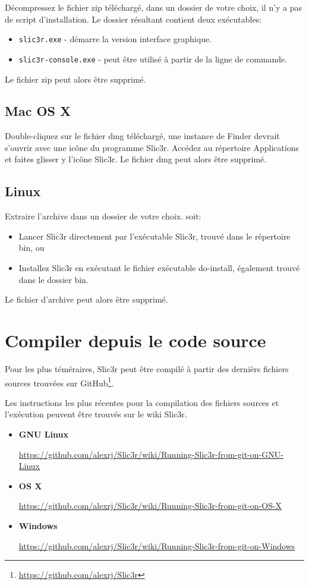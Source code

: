 D\'ecompressez le fichier zip t\'el\'echarg\'e, dans un dossier de votre choix, il n'y a pas de script d'installation. Le dossier r\'esultant contient deux ex\'ecutables:
\begin{itemize}
\item \texttt{slic3r.exe} - d\'emarre la version interface graphique.
\item \texttt{slic3r-console.exe} - peut \^etre utilis\'e \`a partir de la ligne de commande.
\end{itemize}

Le fichier zip peut alors \^etre supprim\'e.

\subsection{Mac OS X}

Double-cliquez sur le fichier dmg t\'el\'echarg\'e, une instance de Finder devrait s'ouvrir avec une ic\^one du programme Slic3r. Acc\'edez au r\'epertoire Applications et faites glisser y l'ic\^one Slic3r.
Le fichier dmg peut alors \^etre supprim\'e.

\subsection{Linux}

Extraire l'archive dans un dossier de votre choix.
soit:
\begin{itemize}
\item Lancer Slic3r directement par l'ex\'ecutable Slic3r, trouv\'e dans le r\'epertoire bin, ou
\item Installez Slic3r en ex\'ecutant le fichier ex\'ecutable do-install, \'egalement trouv\'e dans le dossier bin.
\end{itemize}
Le fichier d'archive peut alors \^etre supprim\'e.



\section{Compiler depuis le code source} %
\label{sec:building_from_source}

Pour les plus t\'em\'eraires, Slic3r peut \^etre compil\'e \`a partir des derni\`ers fichiers sources trouv\'ees sur GitHub\footnote{\url{https://github.com/alexrj/Slic3r}}.

Les instructions les plus r\'ecentes pour la compilation des fichiers sources et l'ex\'ecution peuvent \^etre trouv\'es sur le wiki Slic3r.

\begin{itemize}
    \item \textbf{GNU Linux} \par\url{https://github.com/alexrj/Slic3r/wiki/Running-Slic3r-from-git-on-GNU-Linux}
    \item \textbf{OS X} \par\url{https://github.com/alexrj/Slic3r/wiki/Running-Slic3r-from-git-on-OS-X}
    \item \textbf{Windows} \par\url{https://github.com/alexrj/Slic3r/wiki/Running-Slic3r-from-git-on-Windows}

\end{itemize}

